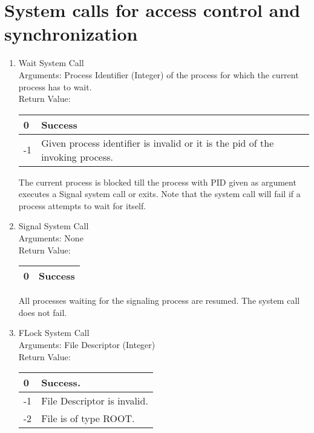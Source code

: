 \section{System calls for access control and synchronization}
\begin{enumerate}
\item{Wait System Call}
\\
Arguments: Process Identifier (Integer) of the process for which the current process has to wait.\\
Return Value:
\FloatBarrier \begin{table}[H]
\centering
\begin{tabular}{|l|l|}
\hline
0	& Success \\ \hline
-1	& Given process identifier is invalid or it is the pid of the invoking process. \\ \hline
\end{tabular}
\end{table} \FloatBarrier 

The current process is blocked till the process with PID given as argument executes a Signal system call or exits. Note that the system call will fail if a process attempts to wait for itself.  

\item{Signal System Call}
\\
Arguments: None\\
Return Value:
\FloatBarrier \begin{table}[H]
\centering
\begin{tabular}{|l|l|}
\hline
0	& Success \\ \hline
\end{tabular}
\end{table} \FloatBarrier 

All processes waiting for the signaling process are resumed. The system call does not fail.


\item{FLock System Call}
\\
Arguments: File Descriptor (Integer)\\
Return Value:
\FloatBarrier \begin{table}[H]
\centering
\begin{tabular}{|l|l|}
\hline
0	& Success. \\ \hline
-1	& File Descriptor is invalid. \\ \hline
-2	& File is of type ROOT. \\ \hline
\end{tabular}
\end{table} \FloatBarrier 


\end{enumerate}
